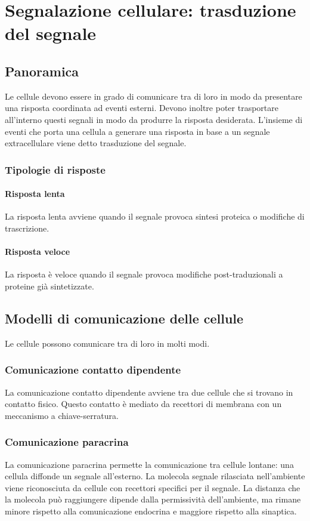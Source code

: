 \chapter{Segnalazione cellulare: trasduzione del segnale}

\section{Panoramica}
Le cellule devono essere in grado di comunicare tra di loro in modo da presentare una risposta coordinata ad eventi esterni.
Devono inoltre poter trasportare all'interno questi segnali in modo da produrre la risposta desiderata.
L'insieme di eventi che porta una cellula a generare una risposta in base a un segnale extracellulare viene detto trasduzione del segnale.

	\subsection{Tipologie di risposte}

		\subsubsection{Risposta lenta}
		La risposta lenta avviene quando il segnale provoca sintesi proteica o modifiche di trascrizione.

		\subsubsection{Risposta veloce}
		La risposta \`e veloce quando il segnale provoca modifiche post-traduzionali a proteine gi\`a sintetizzate.

\section{Modelli di comunicazione delle cellule}
Le cellule possono comunicare tra di loro in molti modi.

	\subsection{Comunicazione contatto dipendente}
	La comunicazione contatto dipendente avviene tra due cellule che si trovano in contatto fisico.
	Questo contatto \`e mediato da recettori di membrana con un meccanismo a chiave-serratura.

	\subsection{Comunicazione paracrina}
	La comunicazione paracrina permette la comunicazione tra cellule lontane: una cellula diffonde un segnale all'esterno.
	La molecola segnale rilasciata nell'ambiente viene riconosciuta da cellule con recettori specifici per il segnale.
	La distanza che la molecola pu\`o raggiungere dipende dalla permissivit\`a dell'ambiente, ma rimane minore rispetto alla comunicazione endocrina e maggiore rispetto alla sinaptica.

